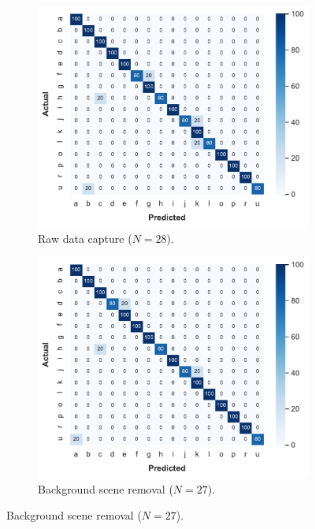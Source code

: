 \begin{figure}[tbp]
    \begin{subfigure}{.49\textwidth}
        \centering
        \includegraphics[width=.99\linewidth]{Figures/RadarExperiments/Datasets/SensorsComparison/Horn/confusion-raw.pdf}
        \vspace{-18pt}
        \captionsetup{width=.99\linewidth}
        \caption{Raw data capture ($N{=}28$).}
        \label{fig:radar-experiments:sensors:horn-confusion:raw}
    \end{subfigure}
    \begin{subfigure}{.49\textwidth}
        \centering
        \includegraphics[width=.99\linewidth]{Figures/RadarExperiments/Datasets/SensorsComparison/Horn/confusion-bgsub.pdf}  
        \vspace{-18pt}
        \captionsetup{width=.99\linewidth}
        \caption{Background scene removal ($N{=}27$).}
        \label{fig:radar-experiments:sensors:horn-confusion:bgsub}
    \end{subfigure}
    

\end{figure}
